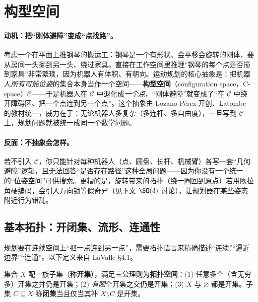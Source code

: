 \section{构型空间}
\label{sec:plan-cspace}

\paragraph{动机：把“刚体避障”变成“点找路”。}
考虑一个在平面上推钢琴的搬运工：钢琴是一个有形状、会平移会旋转的刚体，要从房间一头挪到另一头、绕过家具。直接在工作空间里推理“钢琴的每个点是否撞到家具”非常繁琐，因为机器人有体积、有朝向。运动规划的核心抽象\cite{lavalle2006planning}是：把机器人\emph{所有可能位姿}的集合本身当作一个空间——\textbf{构型空间}（configuration space，C-space）$\mathcal{C}$——于是机器人在 $\mathcal{C}$ 中退化成\emph{一个点}，“刚体避障”就变成了“在 $\mathcal{C}$ 中绕开障碍区、把一个点连到另一个点”。这个抽象由 Lozano-Pérez 开创、Latombe 的教材统一，威力在于：无论机器人多复杂（多连杆、多自由度），一旦写到 $\mathcal{C}$ 上，规划问题就被统一成同一个数学问题。

\paragraph{反面：不抽象会怎样。}
若不引入 $\mathcal{C}$，你只能针对每种机器人（点、圆盘、长杆、机械臂）各写一套“几何避障”逻辑，且无法回答“是否存在路径”这种全局问题——因为你没有一个统一的“位姿空间”可供搜索。更糟的是，旋转带来的拓扑（绕一圈回到原点）若用欧拉角硬编码，会引入万向锁等假奇异（见下文 $\SO(3)$ 讨论），让规划器在某些姿态附近行为错乱。

\subsection{基本拓扑：开闭集、流形、连通性}
\label{sec:plan-topology}

规划要在连续空间上“把一点连到另一点”，需要拓扑语言来精确描述“连续”“逼近边界”“连通”。以下定义来自 LaValle\cite{lavalle2006planning} §4.1。

\begin{definition}[拓扑空间与开闭集]\label{def:plan-topology}
集合 $X$ 配一族子集（称\textbf{开集}），满足三公理则为\textbf{拓扑空间}：(1) 任意多个（含无穷多）开集之并仍是开集；(2) \emph{有限}个开集之交仍是开集；(3) $X$ 与 $\varnothing$ 都是开集。子集 $C\subseteq X$ 称\textbf{闭集}当且仅当其补 $X\setminus C$ 是开集。
\end{definition}

